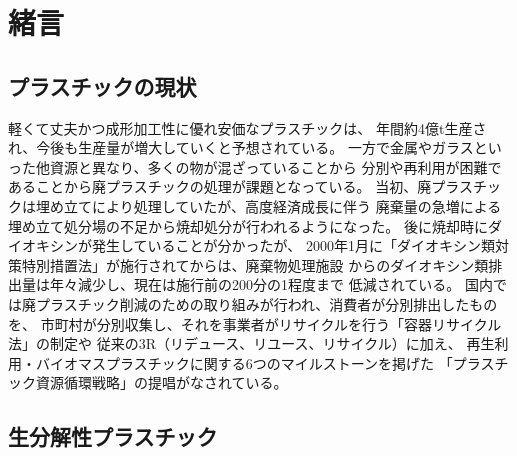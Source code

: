 \section{緒言}
\subsection{プラスチックの現状}
軽くて丈夫かつ成形加工性に優れ安価なプラスチックは、
年間約4億t生産され、今後も生産量が増大していくと予想されている。
一方で金属やガラスといった他資源と異なり、多くの物が混ざっていることから
分別や再利用が困難であることから廃プラスチックの処理が課題となっている。
当初、廃プラスチックは埋め立てにより処理していたが、高度経済成長に伴う
廃棄量の急増による埋め立て処分場の不足から焼却処分が行われるようになった。
後に焼却時にダイオキシンが発生していることが分かったが、
2000年1月に「ダイオキシン類対策特別措置法」が施行されてからは、廃棄物処理施設
からのダイオキシン類排出量は年々減少し、現在は施行前の200分の1程度まで
低減されている。
国内では廃プラスチック削減のための取り組みが行われ、消費者が分別排出したものを、
市町村が分別収集し、それを事業者がリサイクルを行う「容器リサイクル法」の制定や
従来の3R（リデュース、リユース、リサイクル）に加え、
再生利用・バイオマスプラスチックに関する6つのマイルストーンを掲げた
「プラスチック資源循環戦略」の提唱がなされている。

\subsection{生分解性プラスチック}